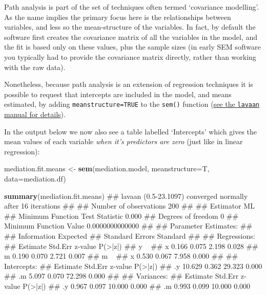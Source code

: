 \documentclass[]{article}
\newenvironment{Shaded}{\begin{snugshade}}{\end{snugshade}}
\newcommand{\KeywordTok}[1]{\textcolor[rgb]{0.13,0.29,0.53}{\textbf{#1}}}
\newcommand{\DataTypeTok}[1]{\textcolor[rgb]{0.13,0.29,0.53}{#1}}
\newcommand{\StringTok}[1]{\textcolor[rgb]{0.31,0.60,0.02}{#1}}
\newcommand{\NormalTok}[1]{#1}
\theoremstyle{definition}
\theoremstyle{definition}
\theoremstyle{definition}
\theoremstyle{remark}
\begin{document}
Path analysis is part of the set of techniques often termed `covariance
modelling'. As the name implies the primary focus here is the
relationships between variables, and less so the mean-structure of the
variables. In fact, by default the software first creates the covariance
matrix of all the variables in the model, and the fit is based only on
these values, plus the sample sizes (in early SEM software you typically
had to provide the covariance matrix directly, rather than working with
the raw data).

Nonetheless, because path analysis is an extension of regression
techniques it is possible to request that intercepts are included in the
model, and means estimated, by adding \texttt{meanstructure=TRUE} to the
\texttt{sem()} function
(\href{http://lavaan.ugent.be/tutorial/means.html}{see the
\texttt{lavaan} manual for details}).

In the output below we now also see a table labelled `Intercepts' which
gives the mean values of each variable \emph{when it's predictors are
zero} (just like in linear regression):

\begin{Shaded}
\begin{Highlighting}[]
\NormalTok{mediation.fit.means <-}\StringTok{ }\KeywordTok{sem}\NormalTok{(mediation.model, }
                           \DataTypeTok{meanstructure=}\NormalTok{T,}
                           \DataTypeTok{data=}\NormalTok{mediation.df)}

\KeywordTok{summary}\NormalTok{(mediation.fit.means)}
\NormalTok{## lavaan (0.5-23.1097) converged normally after  16 iterations}
\NormalTok{## }
\NormalTok{##   Number of observations                           200}
\NormalTok{## }
\NormalTok{##   Estimator                                         ML}
\NormalTok{##   Minimum Function Test Statistic                0.000}
\NormalTok{##   Degrees of freedom                                 0}
\NormalTok{##   Minimum Function Value               0.0000000000000}
\NormalTok{## }
\NormalTok{## Parameter Estimates:}
\NormalTok{## }
\NormalTok{##   Information                                 Expected}
\NormalTok{##   Standard Errors                             Standard}
\NormalTok{## }
\NormalTok{## Regressions:}
\NormalTok{##                    Estimate  Std.Err  z-value  P(>|z|)}
\NormalTok{##   y ~                                                 }
\NormalTok{##     x                 0.166    0.075    2.198    0.028}
\NormalTok{##     m                 0.190    0.070    2.721    0.007}
\NormalTok{##   m ~                                                 }
\NormalTok{##     x                 0.530    0.067    7.958    0.000}
\NormalTok{## }
\NormalTok{## Intercepts:}
\NormalTok{##                    Estimate  Std.Err  z-value  P(>|z|)}
\NormalTok{##    .y                10.629    0.362   29.323    0.000}
\NormalTok{##    .m                 5.097    0.070   72.298    0.000}
\NormalTok{## }
\NormalTok{## Variances:}
\NormalTok{##                    Estimate  Std.Err  z-value  P(>|z|)}
\NormalTok{##    .y                 0.967    0.097   10.000    0.000}
\NormalTok{##    .m                 0.993    0.099   10.000    0.000}
\end{Highlighting}
\end{Shaded}
\end{document}
